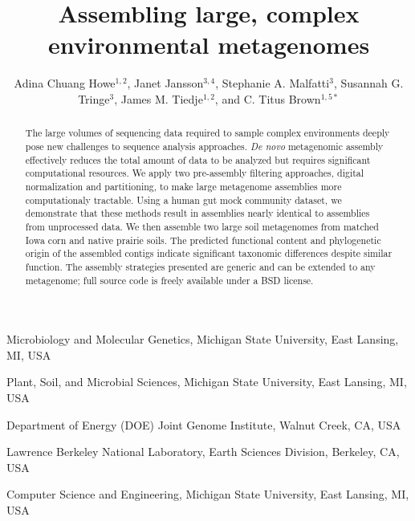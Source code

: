 \documentclass{nature}%
\title{Assembling large, complex environmental metagenomes}
\author{Adina Chuang Howe$^{1,2}$, 
Janet Jansson$^{3,4}$,
Stephanie A. Malfatti$^{3}$,
Susannah G. Tringe$^{3}$,
James M. Tiedje$^{1,2}$, and 
C. Titus Brown$^{1,5\ast}$}
\begin{document}
\maketitle

\begin{affiliations}
\item Microbiology and Molecular Genetics, Michigan State University, East Lansing, MI, USA\\
\item Plant, Soil, and Microbial Sciences, Michigan State University, East Lansing, MI, USA\\
\item Department of Energy (DOE) Joint Genome Institute, Walnut Creek, CA, USA\\
\item Lawrence Berkeley National Laboratory, Earth Sciences Division, Berkeley, CA, USA\\
\item Computer Science and Engineering, Michigan State University, East Lansing, MI, USA\\
\end{affiliations}

\begin{abstract}
The large volumes of sequencing data required to sample complex
environments deeply pose new challenges to sequence analysis approaches.
\emph{De novo} metagenomic assembly effectively reduces the total
amount of data to be analyzed but requires significant computational
resources.  We apply two pre-assembly filtering approaches, digital
normalization and partitioning, to make large metagenome assemblies more computationaly tractable.  Using a human gut
mock community dataset, we demonstrate that these methods result in
assemblies nearly identical to assemblies from unprocessed data.  We
then assemble two large soil metagenomes from matched Iowa corn and
native prairie soils.  The predicted functional content and phylogenetic
origin of the assembled contigs indicate significant taxonomic
differences despite similar function.  The assembly strategies
presented are generic and can be extended to any metagenome; full
source code is freely available under a BSD
license.
\end{abstract}
\end{document}
